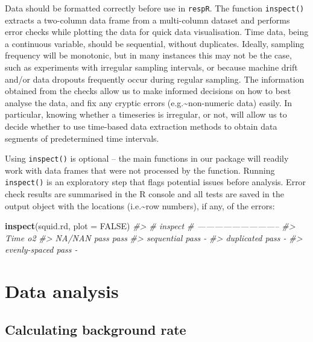 \documentclass[a4paper,10pt, oneside]{memoir}
\newenvironment{Shaded}{\begin{snugshade}}{\end{snugshade}}
\newcommand{\KeywordTok}[1]{\textcolor[rgb]{0.13,0.29,0.53}{\textbf{{#1}}}}
\newcommand{\DataTypeTok}[1]{\textcolor[rgb]{0.13,0.29,0.53}{{#1}}}
\newcommand{\CommentTok}[1]{\textcolor[rgb]{0.56,0.35,0.01}{\textit{{#1}}}}
\newcommand{\OtherTok}[1]{\textcolor[rgb]{0.56,0.35,0.01}{{#1}}}
\newcommand{\NormalTok}[1]{{#1}}
\begin{document}
Data should be formatted correctly before use in \texttt{respR}. The function \texttt{inspect()} extracts a two-column data frame from a multi-column dataset and performs error checks while plotting the data for quick data visualisation.
Time data, being a continuous variable, should be sequential, without duplicates.
Ideally, sampling frequency will be monotonic, but in many instances this may not be the case, such as experiments with irregular sampling intervals, or because machine drift and/or data dropouts frequently occur during regular sampling.
The information obtained from the checks allow us to make informed decisions on how to best analyse the data, and fix any cryptic errors (e.g.\textasciitilde{}non-numeric data) easily.
In particular, knowing whether a timeseries is irregular, or not, will allow us to decide whether to use time-based data extraction methods to obtain data segments of predetermined time intervals.

Using \texttt{inspect()} is optional -- the main functions in our package will readily work with data frames that were not processed by the function.
Running \texttt{inspect()} is an exploratory step that flags potential issues before analysis. Error check results are summarised in the R console and all tests are saved in the output object with the locations (i.e.\textasciitilde{}row numbers), if any, of the errors:

\begin{Shaded}
\begin{Highlighting}[]
\KeywordTok{inspect}\NormalTok{(squid.rd, }\DataTypeTok{plot =} \OtherTok{FALSE}\NormalTok{)}
\CommentTok{#> # inspect # -----------------------------}
\CommentTok{#>               Time   o2}
\CommentTok{#> NA/NAN        pass pass}
\CommentTok{#> sequential    pass    -}
\CommentTok{#> duplicated    pass    -}
\CommentTok{#> evenly-spaced pass    -}
\end{Highlighting}
\end{Shaded}

\section{Data analysis}\label{data-analysis}

\subsection{Calculating background rate}\label{calculating-background-rate}
\end{document}

